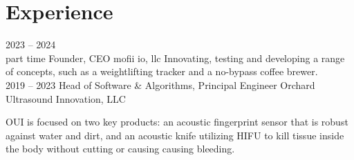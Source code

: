 \documentclass[8pt]{mofiicv}
\begin{document}
	\begin{minipage}[T]{\SecondColumnWidth} 
	\section{Experience}
	\begin{entrylist}
		\entry
			{2023 -- 2024\\\footnotesize{part time}}
			{Founder, CEO}
			{mofii io, llc}
			{
			Innovating, testing and developing a range of concepts, such as a weightlifting tracker and a no-bypass coffee brewer.\\ 
			}
		\entry
			{2019 -- 2023}
			{Head of Software \& Algorithms, Principal Engineer}
			{Orchard Ultrasound Innovation, LLC}
			{
			OUI is focused on two key products: an acoustic fingerprint sensor that is robust against water and dirt, and an acoustic knife utilizing HIFU to kill tissue inside the body without cutting or causing causing bleeding.
			
}
\end{entrylist}
\end{minipage}
\end{document}
